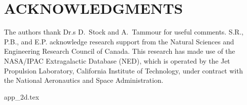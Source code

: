 \documentclass[useAMS,usenatbib]{mn2e}
\begin{document}
\section*{ACKNOWLEDGMENTS}
The authors thank Dr.s D.\ Stock and A.\ Tammour for useful comments. 
S.R., P.B., and E.P. acknowledge research support from the Natural Sciences and Engineering Research Council of Canada. This research has made use of the NASA/IPAC Extragalactic Database (NED), which is operated by the Jet Propulsion Laboratory, California Institute of Technology, under contract with the National Aeronautics and Space Administration.


{app_2d.tex}
\end{document}
